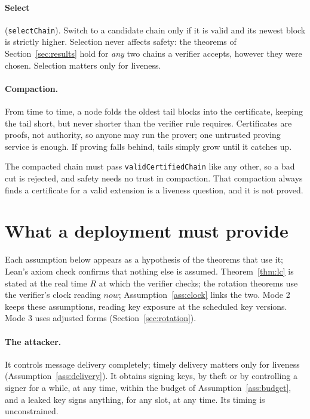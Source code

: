 \documentclass[10pt]{article}
\DeclareRobustCommand{\code}[1]{{\renewcommand{\_}{\textunderscore\allowbreak}\texttt{#1}}}
\begin{document}
\paragraph{Select} (\code{selectChain}). Switch to a candidate chain only
if it is valid and its newest block is strictly higher. Selection never
affects safety: the theorems of Section~\ref{sec:results} hold for
\emph{any} two chains a verifier accepts, however they were chosen.
Selection matters only for liveness.

\paragraph{Compaction.} From time to time, a node folds the oldest tail
blocks into the certificate, keeping the tail short, but never shorter
than the verifier rule requires. Certificates are
proofs, not authority, so anyone may run the prover; one untrusted
proving service is enough. If proving falls behind, tails simply grow
until it catches up.

The compacted chain must pass \code{validCertifiedChain} like any
other, so a bad cut is rejected, and safety needs no trust in
compaction. That compaction always finds a certificate for a valid
extension is a liveness question, and it is not proved.

\section{What a deployment must provide}
\label{sec:assumptions}

Each assumption below appears as a hypothesis of the theorems that use
it; Lean's axiom check confirms that nothing else is assumed.
Theorem~\ref{thm:lc} is stated at the real time $R$ at which the
verifier checks; the rotation theorems use the verifier's clock reading
$\mathit{now}$; Assumption~\ref{ass:clock} links the two. Mode 2 keeps
these assumptions, reading key exposure at the scheduled key versions.
Mode 3 uses adjusted forms (Section~\ref{sec:rotation}).

\paragraph{The attacker.} It controls message delivery completely;
timely delivery matters only for liveness (Assumption~\ref{ass:delivery}).
It obtains signing keys, by theft or by controlling a signer for a while,
at any time, within the budget of Assumption~\ref{ass:budget}, and a
leaked key signs anything, for any slot, at any time. Its timing is
unconstrained.
\end{document}
